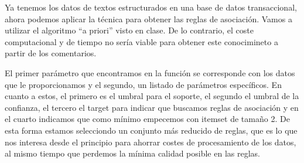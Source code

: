 \documentclass[spanish,]{article}
\newenvironment{Shaded}{\begin{snugshade}}{\end{snugshade}}
\newcommand{\KeywordTok}[1]{\textcolor[rgb]{0.13,0.29,0.53}{\textbf{#1}}}
\newcommand{\StringTok}[1]{\textcolor[rgb]{0.31,0.60,0.02}{#1}}
\newcommand{\CommentTok}[1]{\textcolor[rgb]{0.56,0.35,0.01}{\textit{#1}}}
\newcommand{\ControlFlowTok}[1]{\textcolor[rgb]{0.13,0.29,0.53}{\textbf{#1}}}
\newcommand{\OperatorTok}[1]{\textcolor[rgb]{0.81,0.36,0.00}{\textbf{#1}}}
\newcommand{\NormalTok}[1]{#1}
\begin{document}
\begin{Shaded}
\end{Shaded}

Ya tenemos los datos de textos estructurados en una base de datos
transaccional, ahora podemos aplicar la técnica para obtener las reglas
de asociación. Vamos a utilizar el algoritmo ``a priori'' visto en
clase. De lo contrario, el coste computacional y de tiempo no sería
viable para obtener este conocimineto a partir de los comentarios.

El primer parámetro que encontramos en la función se corresponde con los
datos que le proporcionamos y el segundo, un listado de parámetros
específicos. En cuanto a estos, el primero es el umbral para el soporte,
el segundo el umbral de la confianza, el tercero el target para indicar
que buscamos reglas de asociación y en el cuarto indicamos que como
mínimo empecemos con itemset de tamaño 2. De esta forma estamos
selecciondo un conjunto más reducido de reglas, que es lo que nos
interesa desde el principio para ahorrar costes de procesamiento de los
datos, al mismo tiempo que perdemos la mínima calidad posible en las
reglas.
\end{document}

